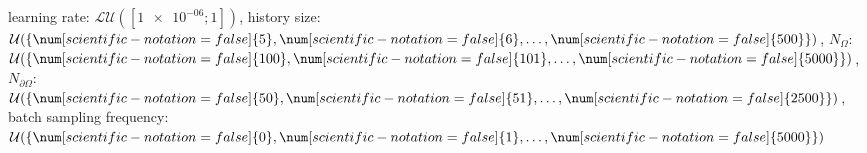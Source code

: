 learning rate: $\mathcal{LU}([\num[scientific-notation=true]{1e-06}; \num[scientific-notation=false]{1}])$, history size: $\mathcal{U}(\{\num[scientific-notation=false]{5},\num[scientific-notation=false]{6},\text{\dots},\num[scientific-notation=false]{500}\})$, $N_{\Omega}$: $\mathcal{U}(\{\num[scientific-notation=false]{100},\num[scientific-notation=false]{101},\text{\dots},\num[scientific-notation=false]{5000}\})$, $N_{\partial\Omega}$: $\mathcal{U}(\{\num[scientific-notation=false]{50},\num[scientific-notation=false]{51},\text{\dots},\num[scientific-notation=false]{2500}\})$, batch sampling frequency: $\mathcal{U}(\{\num[scientific-notation=false]{0},\num[scientific-notation=false]{1},\text{\dots},\num[scientific-notation=false]{5000}\})$